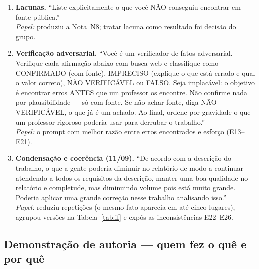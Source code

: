 \documentclass[11pt,a4paper]{article}
\begin{document}
\begin{enumerate}[label=\textbf{P\arabic*.},leftmargin=*]
      \emph{Papel:} evitar apresentar preços de pico como tendência estrutural.
\item \textbf{Lacunas.} ``Liste explicitamente o que você NÃO conseguiu encontrar em fonte
      pública.''\\
      \emph{Papel:} produziu a Nota~N8; tratar lacuna como resultado foi decisão do grupo.
\item \textbf{Verificação adversarial.} ``Você é um verificador de fatos adversarial. Verifique
      cada afirmação abaixo com busca web e classifique como CONFIRMADO (com fonte), IMPRECISO
      (explique o que está errado e qual o valor correto), NÃO VERIFICÁVEL ou FALSO. Seja
      implacável: o objetivo é encontrar erros ANTES que um professor os encontre. Não confirme
      nada por plausibilidade --- só com fonte. Se não achar fonte, diga NÃO VERIFICÁVEL, o que
      já é um achado. Ao final, ordene por gravidade o que um professor rigoroso poderia usar
      para derrubar o trabalho.''\\
      \emph{Papel:} o prompt com melhor razão entre erros encontrados e esforço (E13--E21).
\item \textbf{Condensação e coerência (11/09).} ``De acordo com a descrição do trabalho, o que a
      gente poderia diminuir no relatório de modo a continuar atendendo a todos os requisitos da
      descrição, manter uma boa qualidade no relatório e completude, mas diminuindo volume pois
      está muito grande. Poderia aplicar uma grande correção nesse trabalho analisando isso.''\\
      \emph{Papel:} reduziu repetições (o mesmo fato aparecia em até cinco lugares), agrupou
      versões na Tabela~\ref{tab:if} e expôs as inconsistências E22--E26.
\end{enumerate}

\subsection{Demonstração de autoria --- quem fez o quê e por quê}
\end{document}
